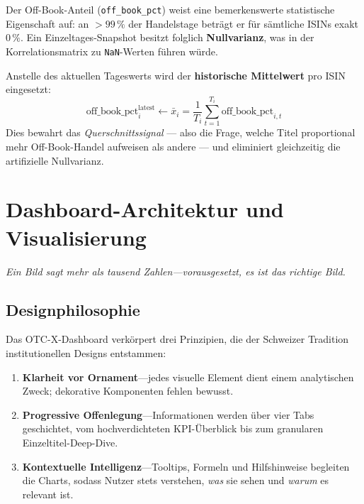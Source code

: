 \documentclass[11pt, a4paper, oneside, openany]{report}
\newcommand{\metr}[1]{\texttt{\footnotesize\textcolor{MetricBlue}{#1}}}
\begin{document}
Der Off-Book-Anteil (\metr{off\_book\_pct}) weist eine bemerkenswerte statistische Eigenschaft auf: an $> 99\,\%$ der Handelstage beträgt er für sämtliche ISINs exakt $0\,\%$. Ein Einzeltages-Snapshot besitzt folglich \textbf{Nullvarianz}, was in der Korrelationsmatrix zu \texttt{NaN}-Werten führen würde.

\begin{mathbox}
Anstelle des aktuellen Tageswerts wird der \textbf{historische Mittelwert} pro ISIN eingesetzt:
\[
  \text{off\_book\_pct}_i^{\text{latest}} \leftarrow \bar{x}_i = \frac{1}{T_i}\sum_{t=1}^{T_i} \text{off\_book\_pct}_{i,t}
\]
Dies bewahrt das \textit{Querschnittssignal} --- also die Frage, welche Titel proportional mehr Off-Book-Handel aufweisen als andere --- und eliminiert gleichzeitig die artifizielle Nullvarianz.
\end{mathbox}


\chapter{Dashboard-Architektur und Visualisierung}
\label{ch:dashboard}

\epigraph{\itshape Ein Bild sagt mehr als tausend Zahlen\;---\;vorausgesetzt, es ist das richtige Bild.}{}

\section{Designphilosophie}

Das OTC-X-Dashboard verkörpert drei Prinzipien, die der Schweizer Tradition institutionellen Designs entstammen:

\begin{enumerate}[label=\textcolor{SwissRed}{\textbf{\arabic*.}}]
  \item \textbf{Klarheit vor Ornament}\;---\;jedes visuelle Element dient einem analytischen Zweck; dekorative Komponenten fehlen bewusst.
  \item \textbf{Progressive Offenlegung}\;---\;Informationen werden über vier Tabs geschichtet, vom hochverdichteten KPI-Überblick bis zum granularen Einzeltitel-Deep-Dive.
  \item \textbf{Kontextuelle Intelligenz}\;---\;Tooltips, Formeln und Hilfshinweise begleiten die Charts, sodass Nutzer stets verstehen, \emph{was} sie sehen und \emph{warum} es relevant ist.
\end{enumerate}
\end{document}
